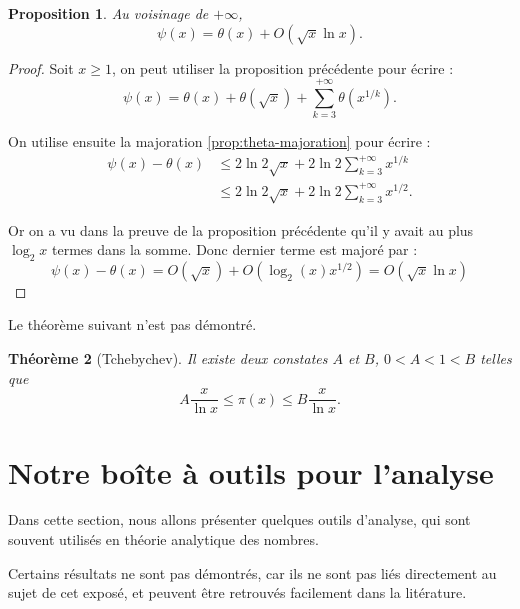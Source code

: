 \documentclass[french]{report}
\newtheorem{theorem}{Théorème}[section]
\newtheorem{proposition}[theorem]{Proposition}
\begin{document}
\begin{proposition}\label{prop:relation-psi-theta}
  Au voisinage de $+\infty$,
  \[
    \psi(x) = \theta(x) + O(\sqrt{x}\ln x).
  \]
\end{proposition}

\begin{proof}
  Soit $x\geq1$, on peut utiliser la proposition précédente pour écrire :
  \[
    \psi(x)
    = \theta(x) + \theta(\sqrt{x})
    + \sum_{k=3}^{+\infty}\theta(x^{1/k}).
  \]

  On utilise ensuite la majoration \ref{prop:theta-majoration} pour écrire :
  \begin{align*}
    \psi(x)-\theta(x)
    &\leq 2\ln2\sqrt{x}
    + 2\ln2\sum_{k=3}^{+\infty}x^{1/k} \\
    &\leq 2\ln2\sqrt{x}
    + 2\ln2\sum_{k=3}^{+\infty}x^{1/2}.
  \end{align*}

  Or on a vu dans la preuve de la proposition précédente qu'il y avait au plus $\log_2x$ termes dans la somme. Donc dernier terme est majoré par :
  \[
    \psi(x)-\theta(x)
    = O(\sqrt{x}) + O(\log_2(x)x^{1/2}) = O(\sqrt{x}\ln x)
  \]
\end{proof}

Le théorème suivant n'est pas démontré.

\begin{theorem}[Tchebychev]
  Il existe deux constates $A$ et $B$, $0<A<1<B$ telles que
  \[
    A\frac{x}{\ln x}\leq\pi(x)\leq B\frac{x}{\ln x}.
  \]
\end{theorem}

\chapter{Notre boîte à outils pour l'analyse}

Dans cette section, nous allons présenter quelques outils d'analyse, qui sont souvent utilisés en théorie analytique des nombres.

Certains résultats ne sont pas démontrés, car ils ne sont pas liés directement au sujet de cet exposé, et peuvent être retrouvés facilement dans la litérature.
\end{document}
